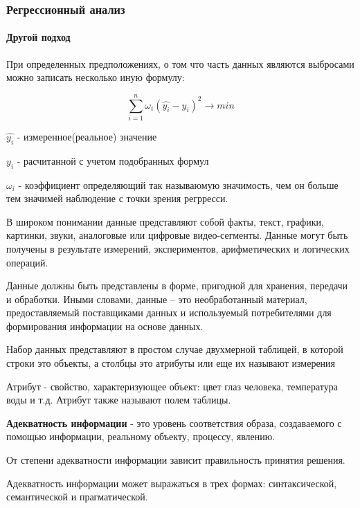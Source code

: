 \documentclass[10pt,pdf,hyperref={unicode}]{beamer}
\begin{document}
\begin{frame}
\frametitle{Регрессионный анализ} 
\framesubtitle{Другой подход}

 При определенных предположениях, о том что часть данных являются 
 выбросами можно записать несколько иную формулу:
 
$$ \sum_{i=1}^n \omega_i(\hat{y_i} -y_i)^2 \rightarrow min$$ 

$\hat{y_i}$ - измеренное(реальное) значение

$y_i$   -  расчитанной с учетом подобранных формул 

$\omega_i$ - коэффициент определяющий так называюмую значимость, чем он больше  тем значимей наблюдение с точки зрения
регрресси.  


\end{frame}



\begin{frame}

В широком понимании данные представляют собой факты, текст,
графики, картинки, звуки, аналоговые или цифровые видео-сегменты.
Данные могут быть получены в результате измерений, экспериментов,
арифметических и логических операций.

\end{frame}

\begin{frame}
Данные должны быть представлены в форме, пригодной для 
хранения, передачи и обработки. Иными словами, данные --
это необработанный материал, предоставляемый поставщиками данных и используемый
потребителями для формирования информации на основе данных.
\end{frame}

\begin{frame}
Набор данных  представляют в простом случае двухмерной таблицей, в которой 
строки это объекты, а столбцы это атрибуты или еще их называют измерения

Атрибут - свойство, характеризующее объект: цвет глаз человека,
температура воды и т.д. Атрибут также называют полем таблицы.
\end{frame}



\begin{frame}

\textbf{Адекватность информации } - это уровень соответствия образа, создаваемого с помощью информации, реальному объекту, процессу, явлению.
 
 От степени адекватности информации зависит правильность принятия решения.

Адекватность информации может выражаться в трех формах: синтаксической, семантической и прагматической.

\end{frame}
\end{document}
